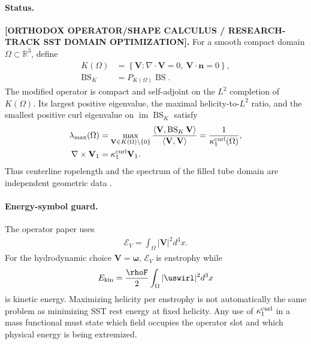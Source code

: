 \paragraph{Status.}
\textbf{[ORTHODOX OPERATOR/SHAPE CALCULUS / RESEARCH-TRACK SST DOMAIN OPTIMIZATION].}
For a smooth compact domain $\Omega\subset\mathbb R^3$, define
\begin{align}
    K(\Omega)
    &=
    \left\{
        \mathbf V:\nabla\cdot\mathbf V=0,
        \ \mathbf V\cdot\mathbf n=0
    \right\},\\
    \operatorname{BS}_{K}
    &=
    P_{K(\Omega)}\operatorname{BS} .
    \label{eq:rt_isoperimetric_projected_bs}
\end{align}
The modified operator is compact and self-adjoint on the $L^2$ completion of
$K(\Omega)$.  Its largest positive eigenvalue, the maximal helicity-to-$L^2$
ratio, and the smallest positive curl eigenvalue on
$\operatorname{im}\operatorname{BS}_{K}$ satisfy
\begin{align}
    \lambda_{\max}(\Omega)
    &=
    \max_{\mathbf V\in K(\Omega)\setminus\{0\}}
    \frac{\langle\mathbf V,
    \operatorname{BS}_{K}\mathbf V\rangle}
    {\langle\mathbf V,\mathbf V\rangle}
    =
    \frac{1}{\kappa_{1}^{\rm curl}(\Omega)},
    \label{eq:rt_isoperimetric_equivalent_problems}\\
    \nabla\times\mathbf V_1
    &=
    \kappa_{1}^{\rm curl}\mathbf V_1 .
    \label{eq:rt_isoperimetric_beltrami_field}
\end{align}
Thus centerline ropelength and the spectrum of the filled tube domain are
independent geometric data \cite{CantarellaDeTurckGluckTeytel2000Isoperimetric}.

\paragraph{Energy-symbol guard.}
The operator paper uses
\begin{align}
    \mathscr E_V
    =
    \int_{\Omega}|\mathbf V|^2d^3x .
    \label{eq:rt_isoperimetric_l2_energy}
\end{align}
For the hydrodynamic choice $\mathbf V=\boldsymbol\omega$,
$\mathscr E_V$ is enstrophy while
\begin{align}
    E_{\rm kin}
    =
    \frac{\rhoF}{2}\int_{\Omega}|\uswirl|^2d^3x
    \label{eq:rt_isoperimetric_kinetic_energy_guard}
\end{align}
is kinetic energy.  Maximizing helicity per enstrophy is not automatically the
same problem as minimizing SST rest energy at fixed helicity.  Any use of
$\kappa_1^{\rm curl}$ in a mass functional must state which field occupies the
operator slot and which physical energy is being extremized.

